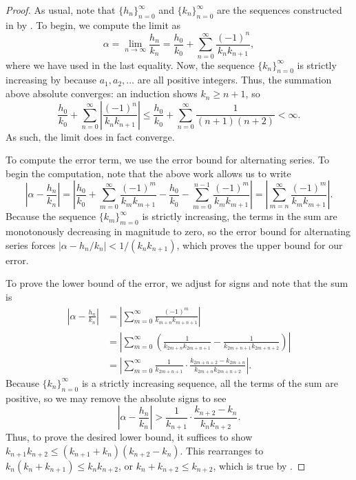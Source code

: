 \documentclass[../notes.tex]{subfiles}
\begin{document}
\begin{proof}
	As usual, note that $\{h_n\}_{n=0}^\infty$ and $\{k_n\}_{n=0}^\infty$ are the sequences constructed in  by . To begin, we compute the limit as
	\[\alpha=\lim_{n\to\infty}\frac{h_n}{k_n} = \frac{h_0}{k_0}+\sum_{n=0}^\infty\frac{(-1)^{n}}{k_nk_{n+1}},\]
	where we have used  in the last equality. Now, the sequence $\{k_n\}_{n=0}^\infty$ is strictly increasing by  because $a_1,a_2,\ldots$ are all positive integers. Thus, the summation above absolute converges: an induction shows $k_n\ge n+1$, so
	\[\frac{h_0}{k_0}+\sum_{n=0}^\infty\left|\frac{(-1)^{n}}{k_nk_{n+1}}\right|\le\frac{h_0}{k_0}+\sum_{n=0}^\infty\frac1{(n+1)(n+2)}<\infty.\]
	As such, the limit does in fact converge.

	To compute the error term, we use the error bound for alternating series. To begin the computation, note that the above work allows us to write
	\[\left|\alpha-\frac{h_n}{k_n}\right| = \left|\frac{h_0}{k_0}+\sum_{m=0}^\infty\frac{(-1)^{m}}{k_mk_{m+1}}-\frac{h_0}{k_0}-\sum_{m=0}^{n-1}\frac{(-1)^{m}}{k_mk_{m+1}}\right| = \left|\sum_{m=n}^\infty\frac{(-1)^{m}}{k_mk_{m+1}}\right|.\]
	Because the sequence $\{k_m\}_{m=0}^\infty$ is strictly increasing, the terms in the sum are monotonously decreasing in magnitude to zero, so the error bound for alternating series forces $\left|\alpha-h_n/k_n\right|<1/(k_nk_{n+1})$, which proves the upper bound for our error.

	To prove the lower bound of the error, we adjust for signs and note that the sum is
	\begin{align*}
		\left|\alpha-\frac{h_n}{k_n}\right| &= \left|\sum_{m=0}^\infty\frac{(-1)^{m}}{k_{m+n}k_{m+n+1}}\right| \\
		&= \left|\sum_{m=0}^\infty\left(\frac1{k_{2m+n}k_{2m+n+1}}-\frac1{k_{2m
		+n+1}k_{2m+n+2}}\right)\right| \\
		&= \left|\sum_{m=0}^\infty\frac1{k_{2m+n+1}}\cdot\frac{k_{2m+n+2}-k_{2m+n}}{k_{2m+n}k_{2m+n+2}}\right|.
	\end{align*}
	Because $\{k_n\}_{n=0}^\infty$ is a strictly increasing sequence, all the terms of the sum are positive, so we may remove the absolute signs to see
	\[\left|\alpha-\frac{h_n}{k_n}\right|>\frac1{k_{n+1}}\cdot\frac{k_{n+2}-k_{n}}{k_{n}k_{n+2}}.\]
	Thus, to prove the desired lower bound, it suffices to show $k_{n+1}k_{n+2}\le(k_{n+1}+k_n)(k_{n+2}-k_n)$. This rearranges to $k_n(k_n+k_{n+1})\le k_nk_{n+2}$, or $k_n+k_{n+2}\le k_{n+2}$, which is true by .
\end{proof}
\end{document}
